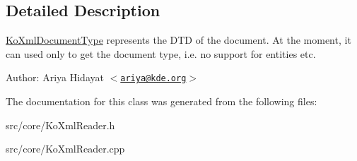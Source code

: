 \subsection{Detailed Description}
\hyperlink{classKoXmlDocumentType}{KoXmlDocumentType} represents the DTD of the document. At the moment, it can used only to get the document type, i.e. no support for entities etc.

\begin{Desc}
\item[Author:]Ariya Hidayat $<$\href{mailto:ariya@kde.org}{\tt ariya@kde.org}$>$ \end{Desc}


The documentation for this class was generated from the following files:\begin{CompactItemize}
\item 
src/core/KoXmlReader.h\item 
src/core/KoXmlReader.cpp\end{CompactItemize}
